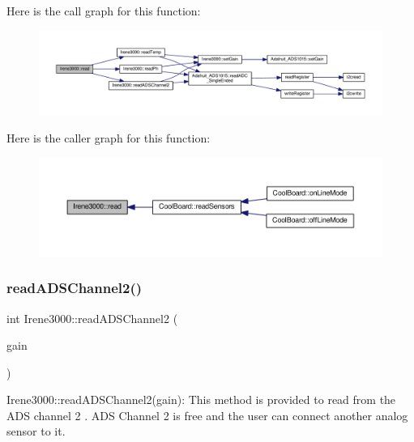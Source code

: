 Here is the call graph for this function\+:\nopagebreak
\begin{figure}[H]
\begin{center}
\leavevmode
\includegraphics[width=350pt]{d6/d03/class_irene3000_a852a170feea994ea1df01c6b245b5d9a_cgraph}
\end{center}
\end{figure}
Here is the caller graph for this function\+:\nopagebreak
\begin{figure}[H]
\begin{center}
\leavevmode
\includegraphics[width=350pt]{d6/d03/class_irene3000_a852a170feea994ea1df01c6b245b5d9a_icgraph}
\end{center}
\end{figure}
\mbox{\label{class_irene3000_ae73bd2ed14a199a7e83f4d6458476a7c}} 
\subsubsection{\texorpdfstring{read\+A\+D\+S\+Channel2()}{readADSChannel2()}}
{\footnotesize\ttfamily int Irene3000\+::read\+A\+D\+S\+Channel2 (\begin{DoxyParamCaption}\item[{\hyperlink{_cool_adafruit___a_d_s1015_8h_a3d6c0e15829a207b9155890811fa4781}{ads\+Gain\+\_\+t}}]{gain }\end{DoxyParamCaption})}

Irene3000\+::read\+A\+D\+S\+Channel2(gain)\+: This method is provided to read from the A\+DS channel 2 . A\+DS Channel 2 is free and the user can connect another analog sensor to it.

